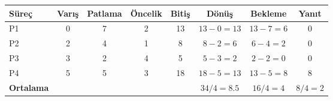 \begin{tabular}{@{}lccccccc@{}}
\toprule
\textbf{Süreç} & \textbf{Varış} & \textbf{Patlama} & \textbf{Öncelik} & \textbf{Bitiş} & \textbf{Dönüş} & \textbf{Bekleme} & \textbf{Yanıt}\\
\midrule
P1 & 0 & 7 & 2 & 13 & $13-0=13$ & $13-7=6$ & 0\\
P2 & 2 & 4 & 1 & 8 & $8-2=6$ & $6-4=2$ & 0\\
P3 & 3 & 2 & 4 & 5 & $5-3=2$ & $2-2=0$ & 0\\
P4 & 5 & 5 & 3 & 18 & $18-5=13$ & $13-5=8$ & 8\\
\midrule
\textbf{Ortalama} &  &  &  &  & $34/4=8.5$ & $16/4=4$ & $8/4=2$\\
\bottomrule
\end{tabular}
